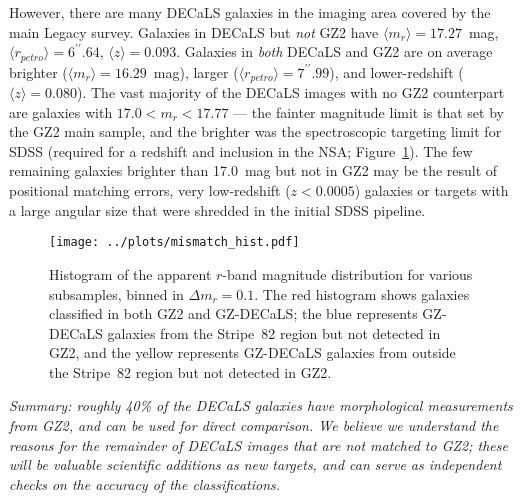 \documentclass[iop,apj,tighten]{emulateapj}
\begin{document}

However, there are many DECaLS galaxies in the imaging area covered by the main Legacy survey. Galaxies in DECaLS but \emph{not} GZ2 have $\langle m_r\rangle = 17.27$~mag, $\langle r_{petro}\rangle = 6^{\prime\prime}.64$, $\langle z\rangle = 0.093$. Galaxies in \emph{both} DECaLS and GZ2 are on average brighter ($\langle m_r\rangle = 16.29$~mag), larger ($\langle r_{petro}\rangle = 7^{\prime\prime}.99$), and lower-redshift ($\langle z\rangle = 0.080$). The vast majority of the DECaLS images with no GZ2 counterpart are galaxies with $17.0 < m_r < 17.77$ --- the fainter magnitude limit is that set by the GZ2 main sample, and the brighter was the spectroscopic targeting limit for SDSS (required for a redshift and inclusion in the NSA; Figure~\ref{fig:mismatch_hist}). The few remaining galaxies brighter than 17.0~mag but not in GZ2 may be the result of positional matching errors, very low-redshift ($z<0.0005$) galaxies or targets with a large angular size that were shredded in the initial SDSS pipeline. 

\begin{figure}
\centering
\texttt{[image: ../plots/mismatch\_hist.pdf]}
\caption{Histogram of the apparent $r$-band magnitude distribution for various  subsamples, binned in $\Delta m_r=0.1$. The red histogram shows galaxies classified in both GZ2 and GZ-DECaLS; the blue represents GZ-DECaLS galaxies from the Stripe~82 region but not detected in GZ2, and the yellow represents GZ-DECaLS galaxies from outside the Stripe~82 region but not detected in GZ2.\label{fig:mismatch_hist}}
\end{figure}

\emph{Summary: roughly 40\% of the DECaLS galaxies have morphological measurements from GZ2, and can be used for direct comparison. We believe we understand the reasons for the remainder of DECaLS images that are not matched to GZ2; these will be valuable scientific additions as new targets, and can serve as independent checks on the accuracy of the classifications.}
\end{document}
